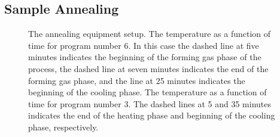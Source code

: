 \subsection{Sample Annealing}\label{subsec:annealing}
\begin{figure}[ht]
    \centering
    \qquad
    \caption[Annealing equipment and annealing program temperature as a function of time]{
        \protect{} The annealing equipment setup. 
        \protect{} The temperature as a function of time for program number 6. In this case the dashed line at five minutes indicates the beginning of the forming gas phase of the process, the dashed line at seven minutes indicates the end of the forming gas phase, and the line at 25 minutes indicates the beginning of the cooling phase.
        \protect{} The temperature as a function of time for program number 3. The dashed lines at 5 and 35 minutes indicates the end of the heating phase and beginning of the cooling phase, respectively. 
    }
\end{figure}

